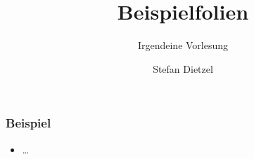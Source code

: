 \documentclass{uulm-slides}
\title	  {Beispielfolien}
\subtitle {Irgendeine Vorlesung}
\author   {Stefan Dietzel}
\begin{document}
	\maketitle
	
	\begin{frame}
		\frametitle{Beispiel}
		
		\begin{itemize}
			\item \dots
		\end{itemize}
	\end{frame}
\end{document}
